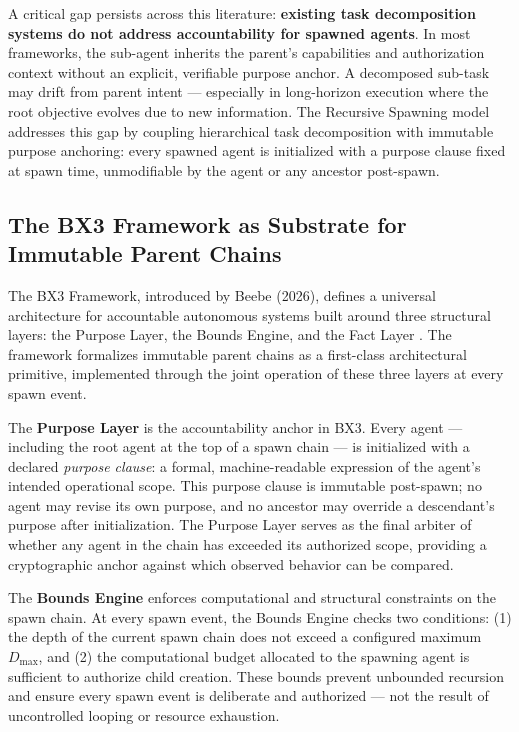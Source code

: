 A critical gap persists across this literature: \textbf{existing task decomposition systems do not address accountability for spawned agents}. In most frameworks, the sub-agent inherits the parent's capabilities and authorization context without an explicit, verifiable purpose anchor. A decomposed sub-task may drift from parent intent — especially in long-horizon execution where the root objective evolves due to new information. The Recursive Spawning model addresses this gap by coupling hierarchical task decomposition with immutable purpose anchoring: every spawned agent is initialized with a purpose clause fixed at spawn time, unmodifiable by the agent or any ancestor post-spawn.

\subsection{The BX3 Framework as Substrate for Immutable Parent Chains}
\label{sec:bx3}

The BX3 Framework, introduced by Beebe (2026), defines a universal architecture for accountable autonomous systems built around three structural layers: the Purpose Layer, the Bounds Engine, and the Fact Layer \cite{bx3framework2026}. The framework formalizes immutable parent chains as a first-class architectural primitive, implemented through the joint operation of these three layers at every spawn event.

The \textbf{Purpose Layer} is the accountability anchor in BX3. Every agent — including the root agent at the top of a spawn chain — is initialized with a declared \textit{purpose clause}: a formal, machine-readable expression of the agent's intended operational scope. This purpose clause is immutable post-spawn; no agent may revise its own purpose, and no ancestor may override a descendant's purpose after initialization. The Purpose Layer serves as the final arbiter of whether any agent in the chain has exceeded its authorized scope, providing a cryptographic anchor against which observed behavior can be compared.

The \textbf{Bounds Engine} enforces computational and structural constraints on the spawn chain. At every spawn event, the Bounds Engine checks two conditions: (1) the depth of the current spawn chain does not exceed a configured maximum $D_{\max}$, and (2) the computational budget allocated to the spawning agent is sufficient to authorize child creation. These bounds prevent unbounded recursion and ensure every spawn event is deliberate and authorized — not the result of uncontrolled looping or resource exhaustion.

